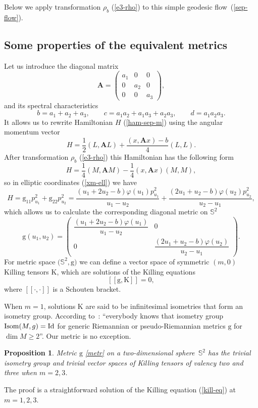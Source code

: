 \documentclass[pdftex]{sigma}
\numberwithin{equation}{section}
\newtheorem{Proposition}[Theorem]{Proposition}
 { \theoremstyle{definition}
\newtheorem{Definition}[Theorem]{Definition}
\newtheorem{Note}[Theorem]{Note}
\newtheorem{Example}[Theorem]{Example}
\newtheorem{Remark}[Theorem]{Remark} }
\begin{document}
Below we apply transformation $\rho_b$ (\ref{e3-rho}) to this simple geodesic flow~(\ref{sep-flow}).

\subsection{Some properties of the equivalent metrics}
Let us introduce the diagonal matrix
\[
\mathbf A=\left(
 \begin{matrix}
 {a}_1 & 0 & 0 \\
 0 & {a}_2 & 0 \\
 0 & 0 & {a}_3
 \end{matrix}
 \right) ,
\]
and its spectral characteristics
\begin{equation}\label{bcd}
b=a_1+a_2+a_3 ,\qquad c=a_1a_2+a_1a_3+a_2a_3 ,\qquad d=a_1a_2a_3.
\end{equation}
It allows us to rewrite Hamiltonian $H$ (\ref{ham-sep-m}) using the angular momentum vector
\[
H=\dfrac{1}{2}(L,\mathbf A L) +\dfrac{(x,\mathbf A x) - b}{4} (L,L) .
\]
After transformation $\rho_b$ (\ref{e3-rho}) this Hamiltonian has the following form
\begin{equation}\label{Hams}
H=\frac{1}{4}(M,\mathbf AM)-\frac{1}{4}(x,\mathbf Ax)(M,M) ,
\end{equation}
so in elliptic coordinates (\ref{xm-ell}) we have
\begin{equation}\label{H}
H= \mathrm g_{11} p_{u_1}^2+\mathrm g_{22}p_{u_2}^2=\frac{(u_1+2u_2-b)\varphi(u_1)p_{u_1}^2}{u_1-u_2}+\frac{( 2u_1 + u_2-b)\varphi(u_2)p_{u_2}^2}{u_2 - u_1} ,
\end{equation}
which allows us to calculate the corresponding diagonal metric on $\mathbb S^2$
\begin{equation}\label{metr}
\mathrm g(u_1,u_2)=\left( \begin{matrix}
 \dfrac{(u_1+2u_2-b)\varphi(u_1)}{u_1-u_2} &0 \\
 0 &\dfrac{( 2u_1 + u_2-b)\varphi(u_2)}{u_2 - u_1}
 \end{matrix} \right) .
\end{equation}
For metric space $\big(\mathbb S^2,\mathrm g\big) $ we can define a vector space of symmetric $ (m, 0)$ Killing tensors $\mathrm K$, which are solutions of the Killing equations
\begin{equation}\label{kill-eq}
[\![\mathrm g, \mathrm K]\!]=0 ,
\end{equation}
where $[\![\cdot,\cdot]\!]$ is a Schouten bracket.

When $m = 1$, solutions $\mathrm K$ are said to be infinitesimal isometries that form an isometry group. According to~\cite{grom99}: ``everybody knows that isometry group ${\rm Isom}(M, g) = {\rm Id}$ for generic Riemannian or pseudo-Riemannian metrics $\mathrm g $ for $\dim M\geq 2$''. Our metric is no exception.
\begin{Proposition}
Metric $\mathrm g$ \eqref{metr} on a two-dimensional sphere~$\mathbb S^2$ has the trivial isometry group and trivial vector spaces of Killing tensors of valency two and three when $m=2,3$.
\end{Proposition}
\par\noindent
The proof is a straightforward solution of the Killing equation (\ref{kill-eq}) at $m=1,2,3$.
\end{document}
